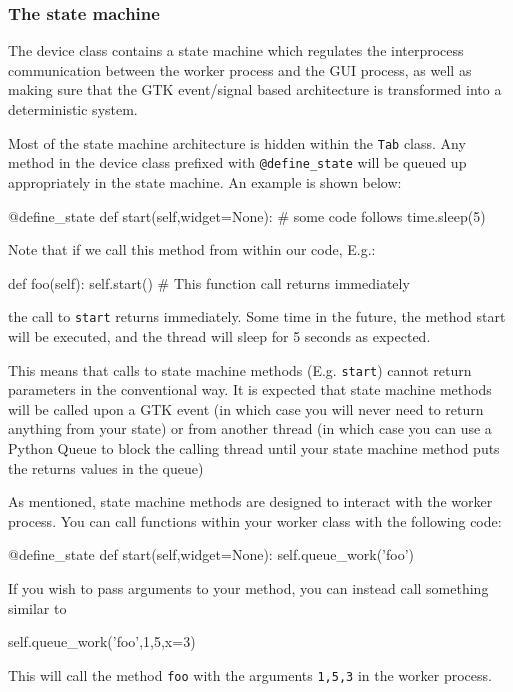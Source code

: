 \documentclass[12pt]{article}
\begin{document}
\subsubsection{The state machine}\label{device_class_state_machine}
The device class contains a state machine which regulates the interprocess communication between the worker process and the GUI process, as well as making sure that the GTK event/signal based architecture is transformed into a deterministic system. 

Most of the state machine architecture is hidden within the \texttt{Tab} class. Any method in the device class prefixed with \texttt{@define\_state} will be queued up appropriately in the state machine. An example is shown below:
\begin{python}
    @define_state
    def start(self,widget=None):
        # some code follows
        time.sleep(5)
\end{python}

Note that if we call this method from within our code, E.g.:
\begin{python}
    def foo(self):
        self.start() # This function call returns immediately
\end{python}
the call to \texttt{start} returns immediately. Some time in the future, the method start will be executed, and the thread will sleep for 5 seconds as expected.

This means that calls to state machine methods (E.g. \texttt{start}) cannot return parameters in the conventional way. It is expected that state machine methods will be called upon a GTK event (in which case you will never need to return anything from your state) or from another thread (in which case you can use a Python Queue to block the calling thread until your state machine method puts the returns values in the queue)

As mentioned, state machine methods are designed to interact with the worker process. You can call functions within your worker class with the following code:
\begin{python}
    @define_state
    def start(self,widget=None):
        self.queue_work('foo')
\end{python}

If you wish to pass arguments to your method, you can instead call something similar to
\begin{python}
        self.queue_work('foo',1,5,x=3)
\end{python}
This will call the method \texttt{foo} with the arguments \texttt{1,5,3} in the worker process.
\end{document}
